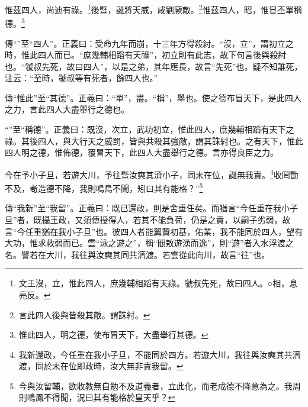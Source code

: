 惟茲四人，尚迪有祿。\footnote{文王沒，立，惟此四人，庶幾輔相蹈有天祿。虢叔先死，故曰四人。○相，息亮反。}後暨，誕將天威，咸劉厥敵。\footnote{言此四人後與皆殺其敵。謂誅紂。}惟茲四人，昭，惟冒丕單稱德。\footnote{惟此四人，明之德，使布冒天下，大盡舉行其德。}


{\noindent\zhuan{}\fzbyks 傳“”至“四人”。正義曰：受命九年而崩，十三年方得殺紂。“沒，立”，謂初立之時，惟此四人而已。“庶幾輔相蹈有天祿”，初立則有此志，故下句言後與殺紂也。“虢叔先死，故曰四人”，以是之弟，其年應長，故言“先死”也。疑不知誰死，注云：“至時，虢叔等有死者，餘四人也。” \par}

{\noindent\zhuan{}\fzbyks 傳“惟此”至“其德”。正義曰：“單”，盡。“稱”，舉也。使之德布冒天下，是此四人之力，言此四人大盡舉行之德也。 \par}

{\noindent\shu{}\fzkt “”至“稱德”。正義曰：既沒，次立，武功初立，惟此四人，庶幾輔相蹈有天下之祿。其後四人，與大行天之威罰，皆與共殺其強敵，謂其誅紂也。之有天下，惟此四人明之德，惟佈德，覆冒天下，此四人大盡舉行之德。言亦得良臣之力。 \par}

今在予小子旦，若遊大川，予往暨汝奭其濟小子，同未在位，誕無我責。\footnote{我新還政，今任重在我小子旦，不能同於四方。若遊大川，我往與汝奭其共濟渡，同於未在位即政時，汝大無非責我留。}收罔勖不及，耇造德不降，我則鳴鳥不聞，矧曰其有能格？”\footnote{今與汝留輔，欲收教無自勉不及道義者，立此化，而老成德不降意為之。我周則鳴鳳不得聞，況曰其有能格於皇天乎？}


{\noindent\zhuan{}\fzbyks 傳“我新”至“我留”。正義曰：既已還政，則是舍重任矣。而猶言“今任重在我小子旦”者，既攝王政，又須傳授得人，若其不能負荷，仍是之責，以嗣子劣弱，故言“今任重猶在我小子旦”也。彼四人者能翼贊初基，佑業，我不能同於四人，望有大功，惟求救弱而已。雲“泳之遊之”，稱“閻敖遊湧而逸”，則“遊”者入水浮渡之名。譬若在大川，我往與汝奭其同共濟渡。若雲從此向川，故言“往”也。 \par}

